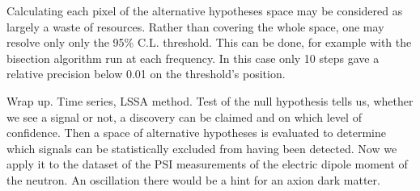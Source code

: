Calculating each pixel of the alternative hypotheses space may be considered as largely a waste of resources. Rather than covering the whole space, one may resolve only only the 95\% C.L. threshold. This can be done, for example with the bisection algorithm run at each frequency. In this case only 10 steps gave a relative precision below 0.01 on the threshold's position.

Wrap up. Time series, LSSA method. Test of the null hypothesis tells us, whether we see a signal or not, a discovery can be claimed and on which level of confidence. Then a space of alternative hypotheses is evaluated to determine which signals can be statistically excluded from having been detected. Now we apply it to the dataset of the PSI measurements of the electric dipole moment of the neutron. An oscillation there would be a hint for an axion dark matter.
